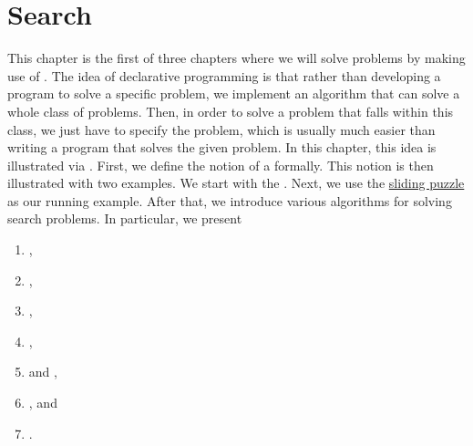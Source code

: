 \chapter{Search}
This chapter is the first of three chapters where we will solve problems by making use of
. 
The idea of declarative programming is that rather than developing a program to solve a specific problem,
we implement an algorithm that can solve a whole class of problems.  Then, in order to solve a problem that
falls within this class, we just have to specify the problem, which is usually much easier than writing a
program that solves the given problem.  In this chapter, this idea is illustrated via .
First, we define the notion of a  formally.  This notion is then illustrated with two
examples.  We start with the .  Next, we use the 
\href{https://en.wikipedia.org/wiki/15_puzzle}{sliding puzzle} as our running example. 
After that, we introduce various algorithms for solving search problems.  In particular, we present
\begin{enumerate}
\item {},
\item {},
\item {},
\item {},
\item {} and ,
\item {}, and
\item {}.
\end{enumerate}

